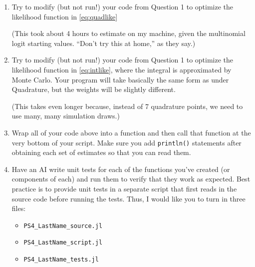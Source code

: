 \documentclass[12pt,english]{article}
\begin{document}
\begin{enumerate}
\item Try to modify (but not run!) your code from Question 1 to optimize the likelihood function in \eqref{eq:quadlike}

(This took about 4 hours to estimate on my machine, given the multinomial logit starting values. ``Don't try this at home,'' as they say.)

\item Try to modify (but not run!) your code from Question 1 to optimize the likelihood function in \eqref{eq:intlike}, where the integral is approximated by Monte Carlo. Your program will take basically the same form as under Quadrature, but the weights will be slightly different.

(This takes even longer because, instead of 7 quadrature points, we need to use many, many simulation draws.)

\item Wrap all of your code above into a function and then call that function at the very bottom of your script. Make sure you add \texttt{println()} statements after obtaining each set of estimates so that you can read them.

\item Have an AI write unit tests for each of the functions you've created (or components of each) and run them to verify that they work as expected. Best practice is to provide unit tests in a separate script that first reads in the source code before running the tests. Thus, I would like you to turn in three files:
    \begin{itemize}
        \item \texttt{PS4\_LastName\_source.jl}
        \item \texttt{PS4\_LastName\_script.jl}
        \item \texttt{PS4\_LastName\_tests.jl}
    \end{itemize}
\end{enumerate}
\end{document}
